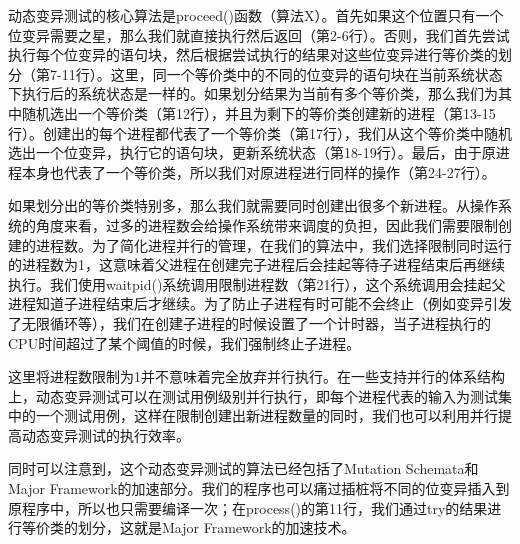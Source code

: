 \documentclass[nofonts]{ctexrep}
\begin{document}
动态变异测试的核心算法是proceed()函数（算法X）。首先如果这个位置只有一个位变异需要之星，那么我们就直接执行然后返回（第2-6行）。否则，我们首先尝试执行每个位变异的语句块，然后根据尝试执行的结果对这些位变异进行等价类的划分（第7-11行）。这里，同一个等价类中的不同的位变异的语句块在当前系统状态下执行后的系统状态是一样的。如果划分结果为当前有多个等价类，那么我们为其中随机选出一个等价类（第12行），并且为剩下的等价类创建新的进程（第13-15行）。创建出的每个进程都代表了一个等价类（第17行），我们从这个等价类中随机选出一个位变异，执行它的语句块，更新系统状态（第18-19行）。最后，由于原进程本身也代表了一个等价类，所以我们对原进程进行同样的操作（第24-27行）。

如果划分出的等价类特别多，那么我们就需要同时创建出很多个新进程。从操作系统的角度来看，过多的进程数会给操作系统带来调度的负担，因此我们需要限制创建的进程数。为了简化进程并行的管理，在我们的算法中，我们选择限制同时运行的进程数为1，这意味着父进程在创建完子进程后会挂起等待子进程结束后再继续执行。我们使用waitpid()系统调用限制进程数（第21行），这个系统调用会挂起父进程知道子进程结束后才继续。为了防止子进程有时可能不会终止（例如变异引发了无限循环等），我们在创建子进程的时候设置了一个计时器，当子进程执行的CPU时间超过了某个阈值的时候，我们强制终止子进程。

这里将进程数限制为1并不意味着完全放弃并行执行。在一些支持并行的体系结构上，动态变异测试可以在测试用例级别并行执行，即每个进程代表的输入为测试集中的一个测试用例，这样在限制创建出新进程数量的同时，我们也可以利用并行提高动态变异测试的执行效率。

同时可以注意到，这个动态变异测试的算法已经包括了Mutation Schemata和Major Framework的加速部分。我们的程序也可以痛过插桩将不同的位变异插入到原程序中，所以也只需要编译一次；在process()的第11行，我们通过try的结果进行等价类的划分，这就是Major Framework的加速技术。
\end{document}
